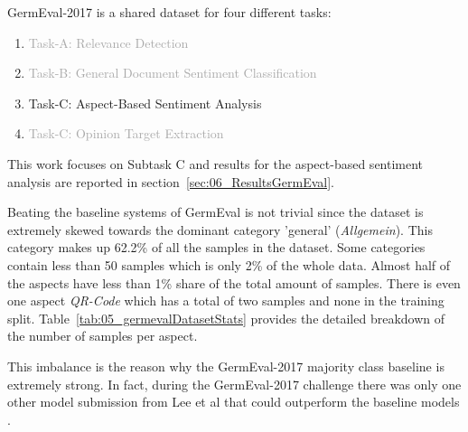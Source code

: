 GermEval-2017 is a shared dataset for four different tasks: 

\begin{enumerate}
	\item \textcolor{darkgray}{Task-A: Relevance Detection}
	\item \textcolor{darkgray}{Task-B: General Document Sentiment Classification}
	\item Task-C: Aspect-Based Sentiment Analysis
	\item \textcolor{darkgray}{Task-C: Opinion Target Extraction}
\end{enumerate}

This work focuses on Subtask C and results for the aspect-based sentiment analysis are reported in section~\ref{sec:06_ResultsGermEval}.
\medskip

Beating the baseline systems of GermEval is not trivial since the dataset is extremely skewed towards the dominant category 'general' {(\textit{Allgemein})}. This category makes up 62.2\% of all the samples in the dataset. Some categories contain less than 50 samples which is only 2\% of the whole data. Almost half of the aspects have less than 1\% share of the total amount of samples. There is even one aspect \textit{QR-Code} which has a total of two samples and none in the training split. Table~\ref{tab:05_germevalDatasetStats} provides the detailed breakdown of the number of samples per aspect.

This imbalance is the reason why the GermEval-2017 majority class baseline is extremely strong. In fact, during the GermEval-2017 challenge there was only one other model submission from Lee et al \cite{Lee2017} that could outperform the baseline models \cite{Wojatzki2017}.
\medskip

